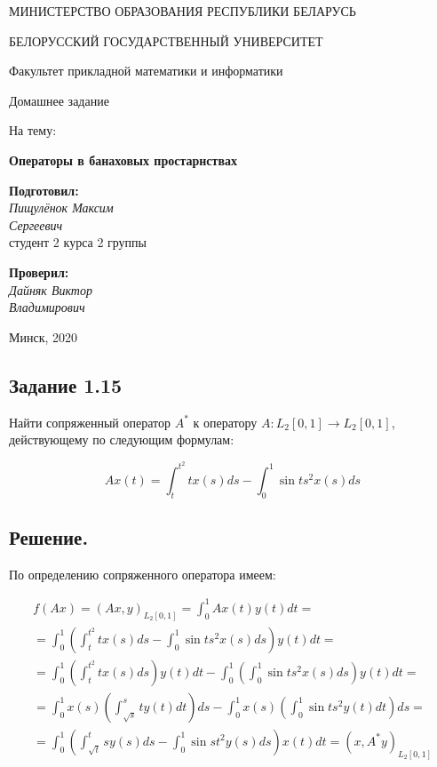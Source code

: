 \documentclass[a4paper, 12pt]{report}
\begin{document}
\begin{titlepage}
    
    \bigskip
    \centerline{\large МИНИСТЕРСТВО ОБРАЗОВАНИЯ РЕСПУБЛИКИ БЕЛАРУСЬ}
    \bigskip
    \centerline{\large БЕЛОРУССКИЙ ГОСУДАРСТВЕННЫЙ УНИВЕРСИТЕТ}
    \bigskip
    \centerline{\large Факультет прикладной математики и информатики}
    \vfill
    \vfill
    \vfill
    \centerline{\LARGE Домашнее задание}
    \bigskip
    \bigskip
    \centerline{\large На тему:}
    \centerline{\large \bf \sc Операторы в банаховых простарнствах}
    \bigskip
    \vfill
    \vfill
    \hfill
    \begin{minipage}{0.3\textwidth}
        {\large{\bf Подготовил:} \\
        {\it Пищулёнок Максим \\ Сергеевич}\\
        {студент 2 курса 2 группы}}
    \end{minipage}
    \vfill
    \hfill
    \begin{minipage}{0.3\textwidth}
      {\large{\bf Проверил:} \\
    {\it Дайняк Виктор \\ Владимирович}}
    \end{minipage}
    \vfill
    \vfill
    \centerline{\large Минск, 2020}
\end{titlepage}
  
\subsection*{Задание 1.15}

Найти сопряженный оператор $A^*$  к оператору $A:L_2[0,1] \to L_2[0,1]$, 
действующему по следующим формулам:

\[Ax(t) = \int_{t}^{t^2}tx(s) ds - \int_0^1 \sin ts^2 x(s) ds\]

\subsection*{Решение.}

По определению сопряженного оператора имеем:

\begin{multline*}
f(Ax) = (Ax, y)_{L_2[0, 1]} = \int_{0}^{1} A x(t) y(t) dt = \\ =
 \int_{ 0}^{1} \left( \int_{t}^{t^2} t x(s) ds - \int_{0}^{1} \sin t s^2 x(s) ds \right) y(t) dt = \\ =
\int_{0}^{1} \left( \int_{t}^{t^2} t x(s) ds \right) y(t) dt - 
 \int_{0}^{1} \left( \int_{0}^{1} \sin t s^2 x(s) ds \right) y(t) dt = \\ =
 \int_{0}^{1} x(s) \left( \int_{\sqrt{s}}^{s} t y(t) dt \right) ds - 
 \int_{0}^{1} x(s) \left( \int_{0}^{1} \sin t s^2 y(t) dt \right) ds = \\ =
 \int_{0}^{1} \left( \int_{\sqrt{t}}^{t} s y(s) ds - \int_{0}^{1} \sin s t^2 y(s)ds \right) x(t) dt = 
 (x, A^* y)_{L_2[0, 1]}
\end{multline*}
\end{document}
